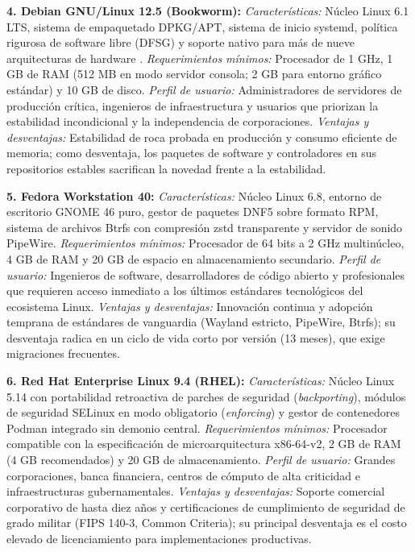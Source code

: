 \documentclass[12pt]{article}
\begin{document}
\smallskip
\noindent\textbf{4. Debian GNU/Linux 12.5 (Bookworm):}
\textit{Características:} Núcleo Linux 6.1 LTS, sistema de empaquetado DPKG/APT, sistema de inicio systemd, política rigurosa de software libre (DFSG) y soporte nativo para más de nueve arquitecturas de hardware \parencite{debianBookworm}.
\textit{Requerimientos mínimos:} Procesador de 1 GHz, 1 GB de RAM (512 MB en modo servidor consola; 2 GB para entorno gráfico estándar) y 10 GB de disco.
\textit{Perfil de usuario:} Administradores de servidores de producción crítica, ingenieros de infraestructura y usuarios que priorizan la estabilidad incondicional y la independencia de corporaciones.
\textit{Ventajas y desventajas:} Estabilidad de roca probada en producción y consumo eficiente de memoria; como desventaja, los paquetes de software y controladores en sus repositorios estables sacrifican la novedad frente a la estabilidad.

\smallskip
\noindent\textbf{5. Fedora Workstation 40:}
\textit{Características:} Núcleo Linux 6.8, entorno de escritorio GNOME 46 puro, gestor de paquetes DNF5 sobre formato RPM, sistema de archivos Btrfs con compresión zstd transparente y servidor de sonido PipeWire.
\textit{Requerimientos mínimos:} Procesador de 64 bits a 2 GHz multinúcleo, 4 GB de RAM y 20 GB de espacio en almacenamiento secundario.
\textit{Perfil de usuario:} Ingenieros de software, desarrolladores de código abierto y profesionales que requieren acceso inmediato a los últimos estándares tecnológicos del ecosistema Linux.
\textit{Ventajas y desventajas:} Innovación continua y adopción temprana de estándares de vanguardia (Wayland estricto, PipeWire, Btrfs); su desventaja radica en un ciclo de vida corto por versión (13 meses), que exige migraciones frecuentes.

\smallskip
\noindent\textbf{6. Red Hat Enterprise Linux 9.4 (RHEL):}
\textit{Características:} Núcleo Linux 5.14 con portabilidad retroactiva de parches de seguridad (\textit{backporting}), módulos de seguridad SELinux en modo obligatorio (\textit{enforcing}) y gestor de contenedores Podman integrado sin demonio central.
\textit{Requerimientos mínimos:} Procesador compatible con la especificación de microarquitectura x86-64-v2, 2 GB de RAM (4 GB recomendados) y 20 GB de almacenamiento.
\textit{Perfil de usuario:} Grandes corporaciones, banca financiera, centros de cómputo de alta criticidad e infraestructuras gubernamentales.
\textit{Ventajas y desventajas:} Soporte comercial corporativo de hasta diez años y certificaciones de cumplimiento de seguridad de grado militar (FIPS 140-3, Common Criteria); su principal desventaja es el costo elevado de licenciamiento para implementaciones productivas.
\end{document}
